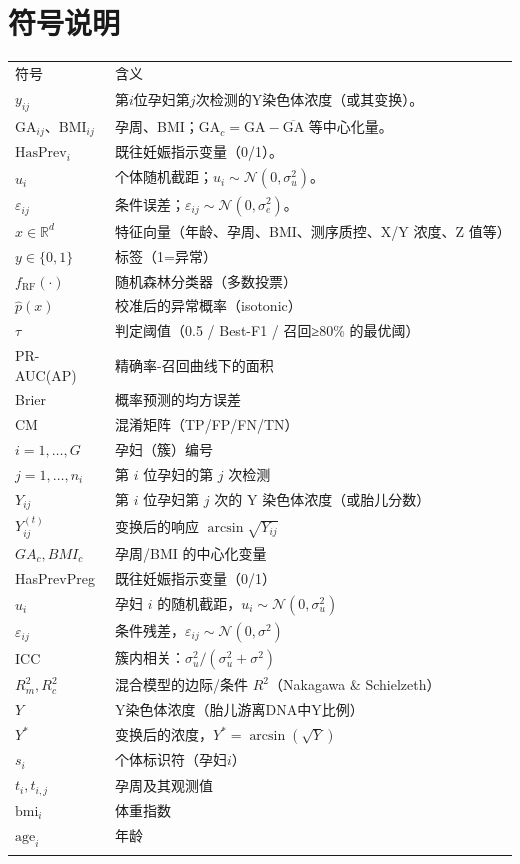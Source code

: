 \documentclass[12pt,a4paper]{ctexart}
\numberwithin{equation}{section}
\newcommand{\toprulethick}{\specialrule{1pt}{1pt}{1pt}}
\newcommand{\midrulethin}{\specialrule{0.5pt}{0pt}{0pt}}
\newcommand{\bottomrulethick}{\specialrule{1pt}{1pt}{1pt}}
\theoremstyle{mcm}
\begin{document}
\section{符号说明}
\begin{longtable}{p{}p{}}
\toprulethick
符号 & 含义 \\
\midrulethin
$y_{ij}$ & 第$i$位孕妇第$j$次检测的Y染色体浓度（或其变换）。\\
$\text{GA}_{ij}$、$\text{BMI}_{ij}$ & 孕周、BMI；$\text{GA}_c=\text{GA}-\overline{\text{GA}}$ 等中心化量。\\
$\text{HasPrev}_i$ & 既往妊娠指示变量（0/1）。\\
$u_i$ & 个体随机截距；$u_i\sim\mathcal{N}(0,\sigma_u^2)$。\\
$\varepsilon_{ij}$ & 条件误差；$\varepsilon_{ij}\sim\mathcal{N}(0,\sigma_e^2)$。\\
\( x \in \mathbb{R}^d \) & 特征向量（年龄、孕周、BMI、测序质控、X/Y 浓度、Z 值等） \\
\( y \in \{0,1\} \) & 标签（1=异常） \\
\( f_{\text{RF}}(\cdot) \) & 随机森林分类器（多数投票） \\
\( \hat{p}(x) \) & 校准后的异常概率（isotonic） \\
\( \tau \) & 判定阈值（0.5 / Best-F1 / 召回≥80\% 的最优阈） \\
PR-AUC(AP) & 精确率-召回曲线下的面积 \\
Brier & 概率预测的均方误差 \\
CM & 混淆矩阵（TP/FP/FN/TN） \\
\( i = 1, \ldots, G \) & 孕妇（簇）编号 \\
\( j = 1, \ldots, n_i \) & 第 \( i \) 位孕妇的第 \( j \) 次检测 \\
\( Y_{ij} \) & 第 \( i \) 位孕妇第 \( j \) 次的 Y 染色体浓度（或胎儿分数） \\
\( Y_{ij}^{(t)} \) & 变换后的响应 \( \arcsin \sqrt{Y_{ij}} \) \\
\(GA_c, BMI_c\) & 孕周/BMI 的中心化变量 \\
HasPrevPreg & 既往妊娠指示变量（0/1） \\
\( u_i \) & 孕妇 \( i \) 的随机截距，\( u_i \sim \mathcal{N}(0, \sigma_u^2) \) \\
\( \varepsilon_{ij} \) & 条件残差，\( \varepsilon_{ij} \sim \mathcal{N}(0, \sigma^2) \)\\
ICC & 簇内相关：\( \sigma_u^2/(\sigma_u^2 + \sigma^2) \) \\
\( R_m^2, R_c^2 \) & 混合模型的边际/条件 \( R^2 \)（Nakagawa \& Schielzeth） \\
\( Y \) & Y染色体浓度（胎儿游离DNA中Y比例）  \\
\( Y^* \) & 变换后的浓度，\( Y^* = \arcsin(\sqrt{Y}) \)  \\
\( s_i \) & 个体标识符（孕妇\( i \)） \\
\( t_i, t_{i,j} \) & 孕周及其观测值 \\
\( \text{bmi}_i \) & 体重指数  \\
\( \text{age}_i \) & 年龄  \\
\bottomrulethick
\end{longtable}
\end{document}
